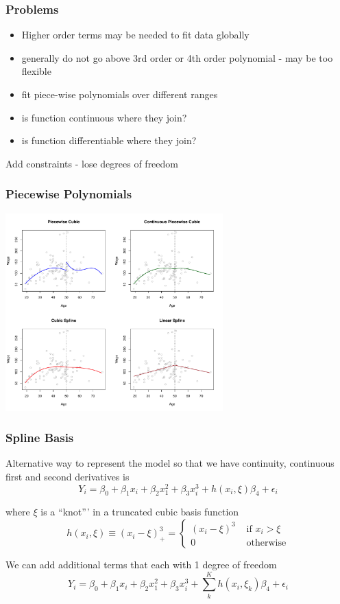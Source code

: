 \documentclass[]{beamer}\usepackage[]{graphicx}\usepackage[]{color}
\begin{document}
\begin{frame}\frametitle{Problems}
  \begin{itemize}
  \item Higher order terms may be needed to fit data globally \pause
  \item generally do not go above 3rd order or 4th order polynomial -
        may be too flexible \pause
  \item fit piece-wise polynomials over different ranges \pause
  \item is function continuous where they join? \pause
  \item is function differentiable where they join? \pause
  \end{itemize}
Add constraints - lose degrees of freedom
\end{frame}

\begin{frame}\frametitle{Piecewise Polynomials}

\centerline{\includegraphics[height=3in]{7-3}}

\end{frame}
\begin{frame}\frametitle{Spline Basis}
Alternative way to represent the model so that we have continuity, continuous first and
second derivatives  is
$$Y_i = \beta_0 + \beta_1 x_i + \beta_2 x_1^2 + \beta_3 x_i^3 + h(x_i,\xi) \beta_4 + \epsilon_i$$

where $\xi$ is a ``knot''' in a truncated cubic basis function
$$
h(x_i, \xi) \equiv (x_i - \xi)^3_+ =  \left\{
\begin{array}{ll}
  (x_i - \xi)^3 & \text{ if }  x_i > \xi \\
  0 & \text{ otherwise}
\end{array} \right.
$$\pause

We can add additional terms that each with 1 degree of freedom
$$Y_i = \beta_0 + \beta_1 x_i + \beta_2 x_1^2 + \beta_3 x_i^3 +
\sum_k^{K}h(x_i,\xi_k) \beta_4 + \epsilon_i$$ \pause


\end{frame}
\end{document}
